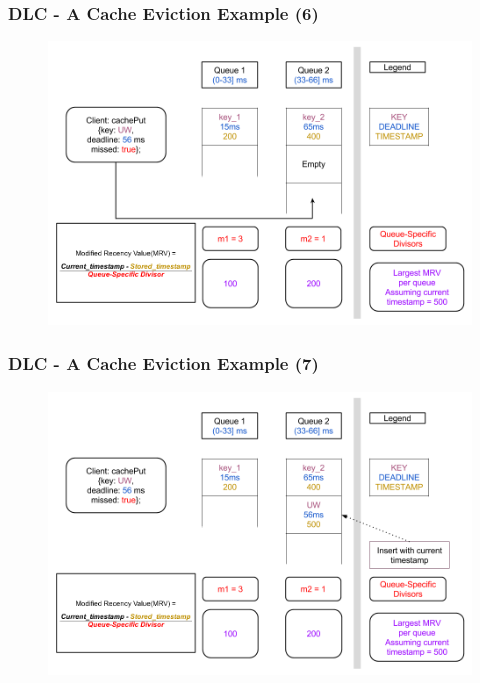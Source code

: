 \documentclass{beamer}
\begin{document}
\begin{frame}
  \frametitle{DLC - A Cache Eviction Example (6)}
  \begin{figure}
    \begin{center}
      \centerline{\includegraphics[scale=0.33]{img/DLC_V6_6.png}}
    \end{center}
  \end{figure}
\end{frame}

\begin{frame}
  \frametitle{DLC - A Cache Eviction Example (7)}
  \begin{figure}
    \begin{center}
      \centerline{\includegraphics[scale=0.33]{img/DLC_V6_7.png}}
    \end{center}
  \end{figure}
\end{frame}
\end{document}
